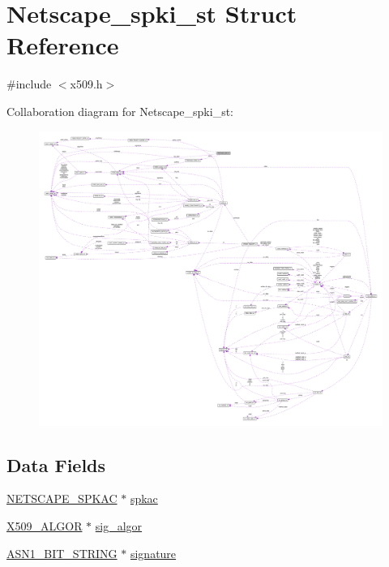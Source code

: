\hypertarget{struct_netscape__spki__st}{}\section{Netscape\+\_\+spki\+\_\+st Struct Reference}
\label{struct_netscape__spki__st}


{\ttfamily \#include $<$x509.\+h$>$}



Collaboration diagram for Netscape\+\_\+spki\+\_\+st\+:\nopagebreak
\begin{figure}[H]
\begin{center}
\leavevmode
\includegraphics[width=350pt]{struct_netscape__spki__st__coll__graph}
\end{center}
\end{figure}
\subsection*{Data Fields}
\begin{DoxyCompactItemize}
\item 
\hyperlink{crypto_2x509_2x509_8h_a490e724bcf7062dddfcbab65a4f452e9}{N\+E\+T\+S\+C\+A\+P\+E\+\_\+\+S\+P\+K\+AC} $\ast$ \hyperlink{struct_netscape__spki__st_ad567707ea85f60c35a8d03c22e7d6d0a}{spkac}
\item 
\hyperlink{crypto_2ossl__typ_8h_aa2b6185e6254f36f709cd6577fb5022e}{X509\+\_\+\+A\+L\+G\+OR} $\ast$ \hyperlink{struct_netscape__spki__st_a0ed9821f84b9d73e711b76571c39d58c}{sig\+\_\+algor}
\item 
\hyperlink{crypto_2ossl__typ_8h_af837aaa00e151b1e8773aea5a8fe1cc4}{A\+S\+N1\+\_\+\+B\+I\+T\+\_\+\+S\+T\+R\+I\+NG} $\ast$ \hyperlink{struct_netscape__spki__st_a0ded22400c40848a864a98aeb7946f1a}{signature}
\end{DoxyCompactItemize}


